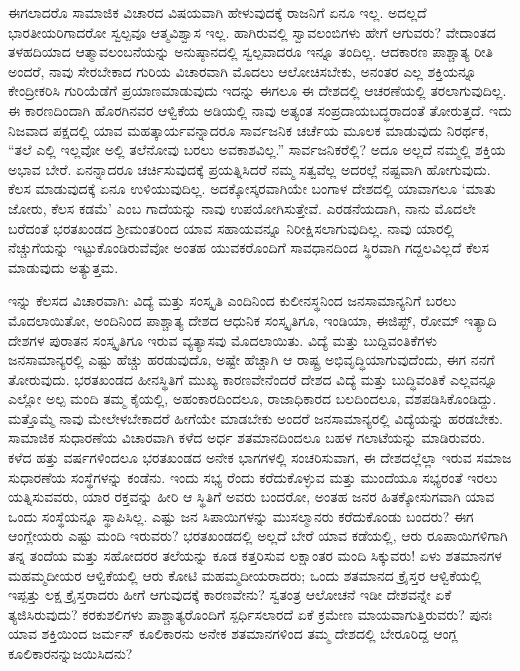 ಈಗಲಾದರೊ ಸಾಮಾಜಿಕ ವಿಚಾರದ ವಿಷಯವಾಗಿ ಹೇಳುವುದಕ್ಕೆ ರಾಜನಿಗೆ ಏನೂ ಇಲ್ಲ. ಅದಲ್ಲದೆ ಭಾರತೀಯರಿಗಾದರೋ ಸ್ವಲ್ಪವೂ ಆತ್ಮವಿಶ್ವಾಸ ಇಲ್ಲ. ಹಾಗಿರುವಲ್ಲಿ ಸ್ವಾವಲಂಬಿಗಳು ಹೇಗೆ ಆಗುವರು? ವೇದಾಂತದ ತಳಹದಿಯಾದ ಆತ್ಮಾವಲಂಬನೆಯನ್ನು ಅನುಷ್ಠಾನದಲ್ಲಿ ಸ್ವಲ್ಪವಾದರೂ ಇನ್ನೂ ತಂದಿಲ್ಲ. ಆದಕಾರಣ ಪಾಶ್ಚಾತ್ಯ ರೀತಿ ಅಂದರೆ, ನಾವು ಸೇರಬೇಕಾದ ಗುರಿಯ ವಿಚಾರವಾಗಿ ಮೊದಲು ಆಲೋಚಿಸಬೇಕು, ಅನಂತರ ಎಲ್ಲ ಶಕ್ತಿಯನ್ನೂ ಕೇಂದ್ರೀಕರಿಸಿ ಗುರಿಯೆಡೆಗೆ ಪ್ರಯಾಣಮಾಡುವುದು\enginline{-} ಇದನ್ನು ಈಗಲೂ ಈ ದೇಶದಲ್ಲಿ ಆಚರಣೆಯಲ್ಲಿ ತರಲಾಗುವುದಿಲ್ಲ. ಈ ಕಾರಣದಿಂದಾಗಿ ಹೊರಗಿನವರ ಆಳ್ವಿಕೆಯ ಅಡಿಯಲ್ಲಿ ನಾವು ಅತ್ಯಂತ ಸಂಪ್ರದಾಯಬದ್ಧರಾದಂತೆ ತೋರುತ್ತದೆ. ಇದು ನಿಜವಾದ ಪಕ್ಷದಲ್ಲಿ ಯಾವ ಮಹತ್ಕಾರ್ಯವನ್ನಾದರೂ ಸಾರ್ವಜನಿಕ ಚರ್ಚೆಯ ಮೂಲಕ ಮಾಡುವುದು ನಿರರ್ಥಕ, “ತಲೆ ಎಲ್ಲಿ ಇಲ್ಲವೋ ಅಲ್ಲಿ ತಲೆನೋವು ಬರಲು ಅವಕಾಶವಿಲ್ಲ.” ಸಾರ್ವಜನಿಕರೆಲ್ಲಿ? ಅದೂ ಅಲ್ಲದೆ ನಮ್ಮಲ್ಲಿ ಶಕ್ತಿಯ ಅಭಾವ ಬೇರೆ. ಏನನ್ನಾದರೂ ಚರ್ಚಿಸುವುದಕ್ಕೆ ಪ್ರಯತ್ನಿಸಿದರೆ ನಮ್ಮ ಸತ್ವವೆಲ್ಲ ಅದರಲ್ಲೆ ನಷ್ಟವಾಗಿ ಹೋಗುವುದು. ಕೆಲಸ ಮಾಡುವುದಕ್ಕೆ ಏನೂ ಉಳಿಯುವುದಿಲ್ಲ. ಅದಕ್ಕೋಸ್ಕರವಾಗಿಯೇ ಬಂಗಾಳ ದೇಶದಲ್ಲಿ ಯಾವಾಗಲೂ ‘ಮಾತು ಜೋರು, ಕೆಲಸ ಕಡಮೆ’ ಎಂಬ ಗಾದೆಯನ್ನು ನಾವು ಉಪಯೋಗಿಸುತ್ತೇವೆ. ಎರಡನೆಯದಾಗಿ, ನಾನು ಮೊದಲೇ ಬರೆದಂತೆ ಭರತಖಂಡದ ಶ‍್ರೀಮಂತರಿಂದ ಯಾವ ಸಹಾಯವನ್ನೂ ನಿರೀಕ್ಷಿಸಲಾಗುವುದಿಲ್ಲ. ನಾವು ಯಾರಲ್ಲಿ ನೆಚ್ಚುಗೆಯನ್ನು ಇಟ್ಟುಕೊಂಡಿರುವೆವೋ ಅಂತಹ ಯುವಕರೊಂದಿಗೆ ಸಾವಧಾನದಿಂದ ಸ್ಥಿರವಾಗಿ ಗದ್ದಲವಿಲ್ಲದೆ ಕೆಲಸ ಮಾಡುವುದು ಅತ್ಯುತ್ತಮ.

ಇನ್ನು ಕೆಲಸದ ವಿಚಾರವಾಗಿ: ವಿದ್ಯೆ ಮತ್ತು ಸಂಸ್ಕೃತಿ ಎಂದಿನಿಂದ ಕುಲೀನಸ್ಥನಿಂದ ಜನಸಾಮಾನ್ಯನಿಗೆ ಬರಲು ಮೊದಲಾಯಿತೋ, ಅಂದಿನಿಂದ ಪಾಶ್ಚಾತ್ಯ ದೇಶದ ಆಧುನಿಕ ಸಂಸ್ಕೃತಿಗೂ, ಇಂಡಿಯಾ, ಈಜಿಪ್ಟ್, ರೋಮ್ ಇತ್ಯಾದಿ ದೇಶಗಳ ಪುರಾತನ ಸಂಸ್ಕೃತಿಗೂ ಇರುವ ವ್ಯತ್ಯಾಸವು ಮೊದಲಾಯಿತು. ವಿದ್ಯೆ ಮತ್ತು ಬುದ್ದಿವಂತಿಕೆಗಳು ಜನಸಾಮಾನ್ಯರಲ್ಲಿ ಎಷ್ಟು ಹೆಚ್ಚು ಹರಡುವುದೊ, ಅಷ್ಟೇ ಹೆಚ್ಚಾಗಿ ಆ ರಾಷ್ಟ್ರ ಅಭಿವೃದ್ಧಿಯಾಗುವುದೆಂದು, ಈಗ ನನಗೆ ತೋರುವುದು. ಭರತಖಂಡದ ಹೀನಸ್ಥಿತಿಗೆ ಮುಖ್ಯ ಕಾರಣವೇನೆಂದರೆ ದೇಶದ ವಿದ್ಯೆ ಮತ್ತು ಬುದ್ಧಿವಂತಿಕೆ ಎಲ್ಲವನ್ನೂ ಎಲ್ಲೋ ಅಲ್ಪ ಮಂದಿ ತಮ್ಮ ಕೈಯಲ್ಲಿ, ಅಹಂಕಾರದಿಂದಲೂ, ರಾಜಾಧಿಕಾರದ ಬಲದಿಂದಲೂ, ವಶಪಡಿಸಿಕೊಂಡಿದ್ದು. ಮತ್ತೊಮ್ಮೆ ನಾವು ಮೇಲೇಳಬೇಕಾದರೆ ಹೀಗೆಯೇ ಮಾಡಬೇಕು\enginline{-} ಅಂದರೆ ಜನಸಾಮಾನ್ಯರಲ್ಲಿ ವಿದ್ಯೆಯನ್ನು ಹರಡಬೇಕು. ಸಾಮಾಜಿಕ ಸುಧಾರಣೆಯ ವಿಚಾರವಾಗಿ ಕಳೆದ ಅರ್ಧ ಶತಮಾನದಿಂದಲೂ ಬಹಳ ಗಲಾಟೆಯನ್ನು ಮಾಡಿರುವರು. ಕಳೆದ ಹತ್ತು ವರ್ಷಗಳಿಂದಲೂ ಭರತಖಂಡದ ಅನೇಕ ಭಾಗಗಳಲ್ಲಿ ಸಂಚರಿಸುವಾಗ, ಈ ದೇಶದಲ್ಲೆಲ್ಲಾ ಇರುವ ಸಮಾಜ ಸುಧಾರಣೆಯ ಸಂಸ್ಥೆಗಳನ್ನು ಕಂಡೆನು. ಇಂದು ಸಭ್ಯ  ರೆಂದು ಕರೆದುಕೊಳ್ಳುವ ಮತ್ತು ಮುಂದೆಯೂ ಸಭ್ಯರಂತೆ ಇರಲು ಯತ್ನಿಸುವವರು, ಯಾರ ರಕ್ತವನ್ನು ಹೀರಿ ಆ ಸ್ಥಿತಿಗೆ ಅವರು ಬಂದರೋ, ಅಂತಹ ಜನರ ಹಿತಕ್ಕೋಸುಗವಾಗಿ ಯಾವ ಒಂದು ಸಂಸ್ಥೆಯನ್ನೂ ಸ್ಥಾಪಿಸಿಲ್ಲ. ಎಷ್ಟು ಜನ ಸಿಪಾಯಿಗಳನ್ನು ಮುಸಲ್ಮಾನರು ಕರೆದುಕೊಂಡು ಬಂದರು? ಈಗ ಆಂಗ್ಲೇಯರು ಎಷ್ಟು ಮಂದಿ ಇರುವರು? ಭರತಖಂಡದಲ್ಲಿ ಅಲ್ಲದೆ ಬೇರೆ ಯಾವ ಕಡೆಯಲ್ಲಿ, ಆರು ರೂಪಾಯಿಗಳಿಗಾಗಿ ತನ್ನ ತಂದೆಯ ಮತ್ತು ಸಹೋದರರ ತಲೆಯನ್ನು ಕೂಡ ಕತ್ತರಿಸುವ ಲಕ್ಷಾಂತರ ಮಂದಿ ಸಿಕ್ಕುವರು! ಏಳು ಶತಮಾನಗಳ ಮಹಮ್ಮದೀಯರ ಆಳ್ವಿಕೆಯಲ್ಲಿ ಆರು ಕೋಟಿ ಮಹಮ್ಮದೀಯರಾದರು; ಒಂದು ಶತಮಾನದ ಕ್ರೈಸ್ತರ ಆಳ್ವಿಕೆಯಲ್ಲಿ ಇಪ್ಪತ್ತು ಲಕ್ಷ ಕ್ರೈಸ್ತರಾದರು \enginline{-} ಹೀಗೆ ಆಗುವುದಕ್ಕೆ ಕಾರಣವೇನು? ಸ್ವತಂತ್ರ ಆಲೋಚನೆ ಇಡೀ ದೇಶವನ್ನೇ ಏಕೆ ತ್ಯಜಿಸಿರುವುದು? ಕರಕುಶಲಿಗಳು ಪಾಶ್ಚಾತ್ಯರೊಂದಿಗೆ ಸ್ಪರ್ಧಿಸಲಾರದೆ ಏಕೆ ಕ್ರಮೇಣ ಮಾಯವಾಗುತ್ತಿರುವರು? ಪುನಃ ಯಾವ ಶಕ್ತಿಯಿಂದ ಜರ್ಮನ್ ಕೂಲಿಕಾರನು ಅನೇಕ ಶತಮಾನಗಳಿಂದ ತಮ್ಮ ದೇಶದಲ್ಲಿ ಬೇರೂರಿದ್ದ ಆಂಗ್ಲ ಕೂಲಿಕಾರನನ್ನು\break ಜಯಿಸಿದನು?

